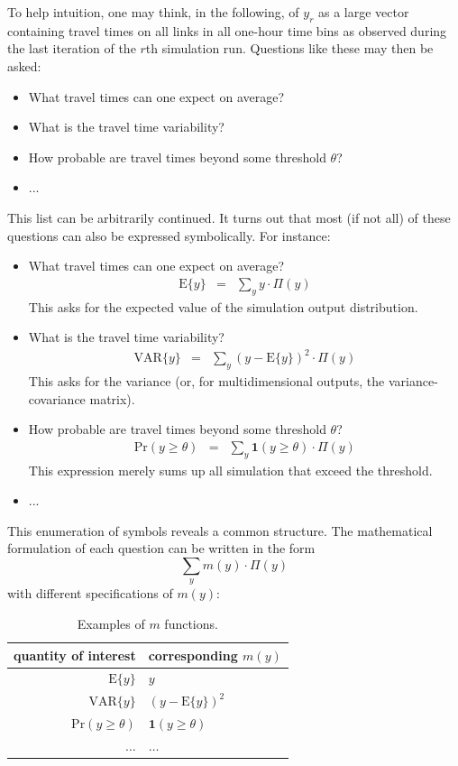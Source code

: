 To help intuition, one may think, in the following, of $y_{r}$ as a
large vector containing travel times on all links in all one-hour
time bins as observed during the last iteration of the $r$th simulation
run. Questions like these may then be asked:
\begin{itemize}
\item What travel times can one expect on average?
\item What is the travel time variability?
\item How probable are travel times beyond some threshold $\theta$?
\item ...
\end{itemize}
This list can be arbitrarily continued. It turns out that most (if
not all) of these questions can also be expressed symbolically. For
instance:
\begin{itemize}
\item What travel times can one expect on average?
\begin{eqnarray}
\text{E}\{y\} & = & \sum_{y}y\cdot\Pi(y)\label{eq:question-exp}
\end{eqnarray}
This asks for the expected value of the simulation output distribution.
\item What is the travel time variability?
\begin{eqnarray}
\text{VAR}\{y\} & = & \sum_{y}(y-\text{E}\{y\})^{2}\cdot\Pi(y)\label{eq:question-var}
\end{eqnarray}
This asks for the variance (or, for multidimensional outputs, the
variance-covariance matrix).
\item How probable are travel times beyond some threshold $\theta$?
\begin{eqnarray}
\text{Pr}(y\geq\theta) & = & \sum_{y}\mathbf{1}(y\geq\theta)\cdot\Pi(y)\label{eq:question-proba}
\end{eqnarray}
This expression merely sums up all simulation  that exceed the threshold.
\item ...
\end{itemize}
This enumeration of symbols reveals a common structure. The mathematical
formulation of each question can be written in the form
\begin{equation}
\sum_{y}m(y)\cdot\Pi(y)\label{eq:exp-of-m}
\end{equation}
with different specifications of $m(y)$:

\begin{center}
\begin{table}[H]
\caption{\label{tab:Examples-of-m}Examples of $m$ functions.}


\centering{}%
\begin{tabular}{r|l}
\hline 
quantity of interest & corresponding $m(y)$ \tabularnewline
\hline 
$\text{E}\{y\}$ & $y$\tabularnewline
$\text{VAR}\{y\}$ & $(y-\text{E}\{y\})^{2}$\tabularnewline
$\text{Pr}(y\geq\theta)$ & $\mathbf{1}(y\geq\theta)$\tabularnewline
$\ldots$ & $\ldots$\tabularnewline
\hline 
\end{tabular}
\end{table}

\par\end{center}

